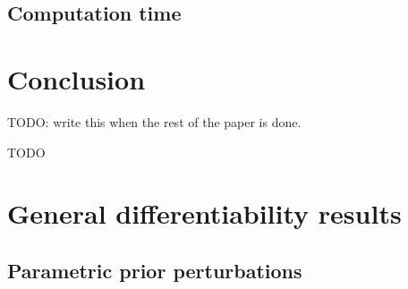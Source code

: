 \documentclass[ba]{imsart}
\begin{document}
    \subsection{Computation time}
    

\section{Conclusion}
TODO: write this when the rest of the paper is done.





\begin{acks}[Acknowledgments]
  TODO
\end{acks}



\appendix

% 

\section{General differentiability results}


    \subsection{Parametric prior perturbations}
    
\end{document}
